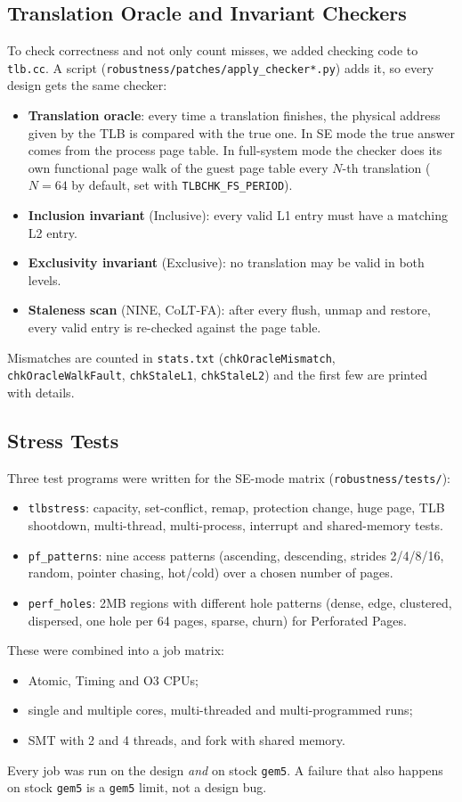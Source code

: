 \subsection{Translation Oracle and Invariant Checkers}
To check correctness and not only count misses, we added checking code to \texttt{tlb.cc}. A script (\texttt{robustness/patches/apply\_checker*.py}) adds it, so every design gets the same checker:
\begin{itemize}
    \item \textbf{Translation oracle}: every time a translation finishes, the physical address given by the TLB is compared with the true one. In SE mode the true answer comes from the process page table. In full-system mode the checker does its own functional page walk of the guest page table every $N$-th translation ($N = 64$ by default, set with \texttt{TLBCHK\_FS\_PERIOD}).
    \item \textbf{Inclusion invariant} (Inclusive): every valid L1 entry must have a matching L2 entry.
    \item \textbf{Exclusivity invariant} (Exclusive): no translation may be valid in both levels.
    \item \textbf{Staleness scan} (NINE, CoLT-FA): after every flush, unmap and restore, every valid entry is re-checked against the page table.
\end{itemize}
Mismatches are counted in \texttt{stats.txt} (\texttt{chkOracleMismatch}, \texttt{chkOracleWalkFault}, \texttt{chkStaleL1}, \texttt{chkStaleL2}) and the first few are printed with details.

\subsection{Stress Tests}
Three test programs were written for the SE-mode matrix (\texttt{robustness/tests/}):
\begin{itemize}
    \item \texttt{tlbstress}: capacity, set-conflict, remap, protection change, huge page, TLB shootdown, multi-thread, multi-process, interrupt and shared-memory tests.
    \item \texttt{pf\_patterns}: nine access patterns (ascending, descending, strides 2/4/8/16, random, pointer chasing, hot/cold) over a chosen number of pages.
    \item \texttt{perf\_holes}: 2MB regions with different hole patterns (dense, edge, clustered, dispersed, one hole per 64 pages, sparse, churn) for Perforated Pages.
\end{itemize}
These were combined into a job matrix:
\begin{itemize}
    \item Atomic, Timing and O3 CPUs;
    \item single and multiple cores, multi-threaded and multi-programmed runs;
    \item SMT with 2 and 4 threads, and fork with shared memory.
\end{itemize}
Every job was run on the design \emph{and} on stock \texttt{gem5}. A failure that also happens on stock \texttt{gem5} is a \texttt{gem5} limit, not a design bug.


